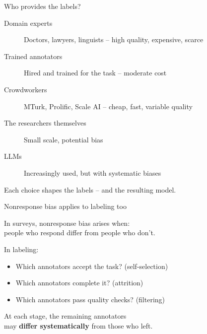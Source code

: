 \documentclass[aspectratio=169,11pt]{beamer}
\begin{document}
\begin{frame}{Who provides the labels?}
\begin{description}
  \item[Domain experts] Doctors, lawyers, linguists -- high quality, expensive, scarce
  \item[Trained annotators] Hired and trained for the task -- moderate cost
  \item[Crowdworkers] MTurk, Prolific, Scale AI -- cheap, fast, variable quality
  \item[The researchers themselves] Small scale, potential bias
  \item[LLMs] Increasingly used, but with systematic biases
\end{description}

\vspace{1em}

Each choice shapes the labels -- and the resulting model.
\end{frame}

\begin{frame}{Nonresponse bias applies to labeling too}

In surveys, nonresponse bias arises when:\\
people who respond differ from people who don't.

\vspace{1em}

In labeling:
\begin{itemize}
  \item Which annotators accept the task? (self-selection)
  \item Which annotators complete it? (attrition)
  \item Which annotators pass quality checks? (filtering)
\end{itemize}

\vspace{1em}

At each stage, the remaining annotators\\
may \textbf{differ systematically} from those who left.
\end{frame}
\end{document}
